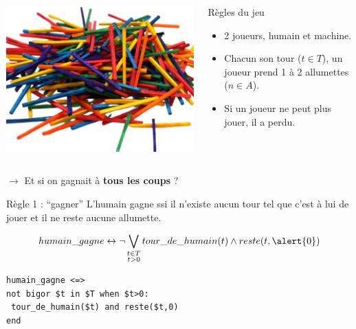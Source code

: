 \documentclass[english,french,usenames,dvipsnames]{beamer}
\begin{document}
\begin{frame}{\subsecname}
\begin{columns}[T]
\begin{column}{0.3\textwidth}
\includegraphics[width=1\textwidth]{figures/allumettes.png}
\end{column}
\begin{column}{0.7\textwidth}
\begin{exampleblock}{Règles du jeu}
\begin{itemize}
\item 2 joueurs, {\color{ForestGreen}humain} et {\color{red}machine}.
\item Chacun son tour ($t \in T$), un joueur prend 1 à 2 allumettes ($n \in A$).
\item Si un joueur ne peut plus jouer, il a perdu.
\end{itemize}
\end{exampleblock}
\end{column}
\end{columns}
\begin{center}
$\longrightarrow$ Et si on gagnait à \textbf{tous les coups} ?    
\end{center}
\end{frame}

\begin{frame}[containsverbatim]{\subsecname}
\begin{exampleblock}{Règle 1 : \enquote{gagner}}
L'{\color{ForestGreen}humain} gagne ssi il n'existe aucun tour tel que c'est à lui de jouer et il ne reste aucune allumette.
\end{exampleblock}
\[
humain\_gagne \leftrightarrow \neg \bigvee_{\substack{t \in T\\t > 0}}
tour\_de\_humain(t) \wedge reste(t,\alert{0})
\]
\begin{verbatim}
humain_gagne <=>
not bigor $t in $T when $t>0:
 tour_de_humain($t) and reste($t,0)
end
\end{verbatim}
\end{frame}
\end{document}
